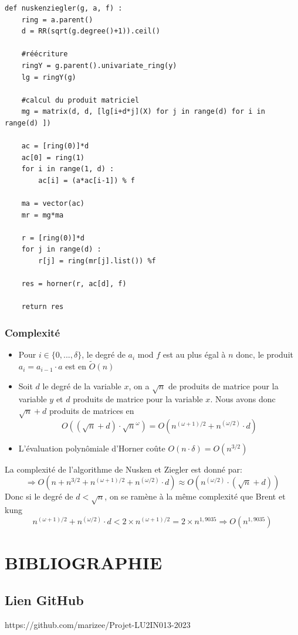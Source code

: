 \documentclass[a4paper]{article}
\begin{document}
\bigskip

\begin{lstlisting}[title={nusken et ziegler}]
def nuskenziegler(g, a, f) :
    ring = a.parent()
    d = RR(sqrt(g.degree()+1)).ceil()

    #réécriture
    ringY = g.parent().univariate_ring(y)
    lg = ringY(g)

    #calcul du produit matriciel
    mg = matrix(d, d, [lg[i+d*j](X) for j in range(d) for i in range(d) ])

    ac = [ring(0)]*d
    ac[0] = ring(1)
    for i in range(1, d) :
        ac[i] = (a*ac[i-1]) % f

    ma = vector(ac)
    mr = mg*ma

    r = [ring(0)]*d
    for j in range(d) :
        r[j] = ring(mr[j].list()) %f
    
    res = horner(r, ac[d], f)

    return res
\end{lstlisting}

\subsubsection*{Complexité}
\begin{itemize}
    \item Pour $i \in \{0,...,\delta\}$, le degré de $a_i$ mod $f$ est au plus égal à $n$ donc, le produit $a_i=a_{i-1}\cdot a$ est en $\tilde{O}(n)$
    \item Soit $d$ le degré de la variable $x$, on a $\sqrt{n}$ de produits de matrice pour la variable $y$ et $d$ produits de matrice pour la variable $x$.
    Nous avons donc $\sqrt{n} + d$ produits de matrices en $$O((\sqrt{n}+d)\cdot \sqrt{n}^{\omega})=O(n^{(\omega+1)/2} + n^{(\omega/2)}\cdot d)$$ 
    \item L'évaluation polynômiale d'Horner coûte $O(n\cdot \delta)=O(n^{3/2})$
\end{itemize}
La complexité de l'algorithme de Nusken et Ziegler est donné par:
\[
\Longrightarrow O(n + n^{3/2} + n^{(\omega+1)/2} + n^{(\omega/2)}\cdot d) \approx O(n^{(\omega/2)}\cdot (\sqrt{n}+d))
\]
Donc si le degré de $d<\sqrt{n}$, on se ramène à la même complexité que Brent et kung
\[
n^{(\omega+1)/2} + n^{(\omega/2)}\cdot d < 2\times{n}^{(\omega+1)/2} = 2\times{n}^{1,9035} \Longrightarrow O(n^{1,9035})
\]

\bigskip
\section{BIBLIOGRAPHIE}

\nocite{*}




\subsection*{Lien GitHub} 
https://github.com/marizee/Projet-LU2IN013-2023
\end{document}
